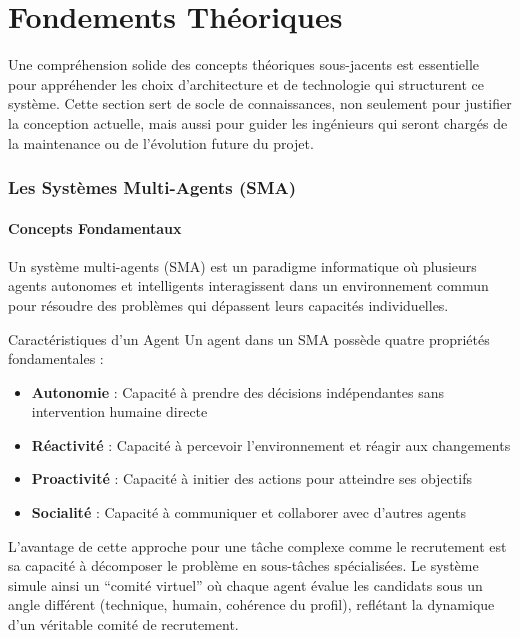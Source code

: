 \documentclass{rapportECL}
\begin{document}
\newpage

\part{Fondements Théoriques}

Une compréhension solide des concepts théoriques sous-jacents est essentielle pour appréhender les choix d'architecture et de technologie qui structurent ce système. Cette section sert de socle de connaissances, non seulement pour justifier la conception actuelle, mais aussi pour guider les ingénieurs qui seront chargés de la maintenance ou de l'évolution future du projet.

\section{Les Systèmes Multi-Agents (SMA)}

\subsection{Concepts Fondamentaux}

Un système multi-agents (SMA) est un paradigme informatique où plusieurs agents autonomes et intelligents interagissent dans un environnement commun pour résoudre des problèmes qui dépassent leurs capacités individuelles. 

\begin{infobox}{Caractéristiques d'un Agent}
Un agent dans un SMA possède quatre propriétés fondamentales :
\begin{itemize}
    \item \textbf{Autonomie} : Capacité à prendre des décisions indépendantes sans intervention humaine directe
    \item \textbf{Réactivité} : Capacité à percevoir l'environnement et réagir aux changements
    \item \textbf{Proactivité} : Capacité à initier des actions pour atteindre ses objectifs
    \item \textbf{Socialité} : Capacité à communiquer et collaborer avec d'autres agents
\end{itemize}
\end{infobox}

L'avantage de cette approche pour une tâche complexe comme le recrutement est sa capacité à décomposer le problème en sous-tâches spécialisées. Le système simule ainsi un ``comité virtuel'' où chaque agent évalue les candidats sous un angle différent (technique, humain, cohérence du profil), reflétant la dynamique d'un véritable comité de recrutement.
\end{document}
